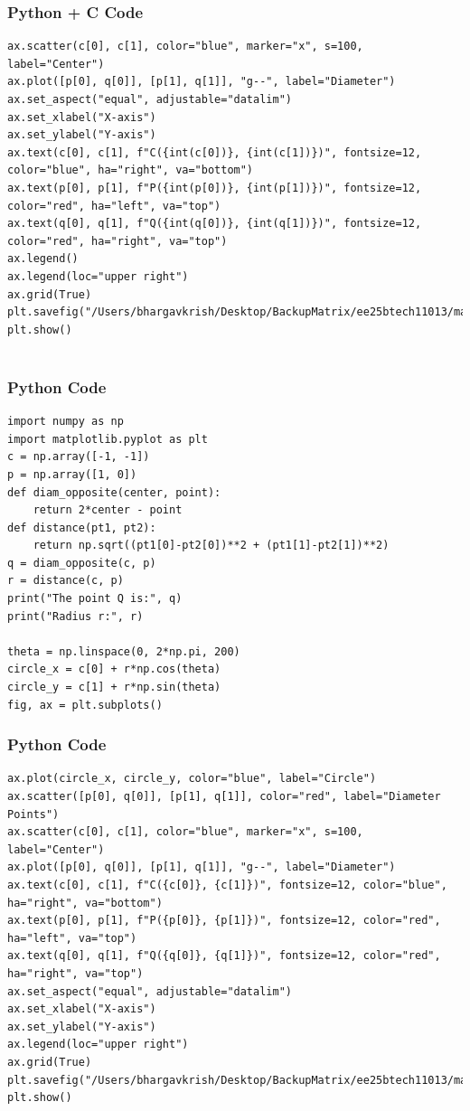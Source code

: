 \documentclass{beamer}
\begin{document}
\begin{frame}[fragile]
    \frametitle{Python + C Code}
    \begin{lstlisting}
ax.scatter(c[0], c[1], color="blue", marker="x", s=100, label="Center")
ax.plot([p[0], q[0]], [p[1], q[1]], "g--", label="Diameter")
ax.set_aspect("equal", adjustable="datalim")
ax.set_xlabel("X-axis")
ax.set_ylabel("Y-axis")
ax.text(c[0], c[1], f"C({int(c[0])}, {int(c[1])})", fontsize=12, color="blue", ha="right", va="bottom")
ax.text(p[0], p[1], f"P({int(p[0])}, {int(p[1])})", fontsize=12, color="red", ha="left", va="top")
ax.text(q[0], q[1], f"Q({int(q[0])}, {int(q[1])})", fontsize=12, color="red", ha="right", va="top")
ax.legend()
ax.legend(loc="upper right")
ax.grid(True)
plt.savefig("/Users/bhargavkrish/Desktop/BackupMatrix/ee25btech11013/matgeo/7.4.20/figs/Figure_1.png")
plt.show()


    \end{lstlisting}
\end{frame}

\begin{frame}[fragile]
    \frametitle{Python Code}
    \begin{lstlisting}
import numpy as np
import matplotlib.pyplot as plt
c = np.array([-1, -1])
p = np.array([1, 0])
def diam_opposite(center, point):
    return 2*center - point
def distance(pt1, pt2):
    return np.sqrt((pt1[0]-pt2[0])**2 + (pt1[1]-pt2[1])**2)
q = diam_opposite(c, p)
r = distance(c, p)
print("The point Q is:", q)
print("Radius r:", r)

theta = np.linspace(0, 2*np.pi, 200)
circle_x = c[0] + r*np.cos(theta)
circle_y = c[1] + r*np.sin(theta)
fig, ax = plt.subplots()
    \end{lstlisting}
\end{frame}
\begin{frame}[fragile]
    \frametitle{Python Code}
    \begin{lstlisting}
ax.plot(circle_x, circle_y, color="blue", label="Circle")
ax.scatter([p[0], q[0]], [p[1], q[1]], color="red", label="Diameter Points")
ax.scatter(c[0], c[1], color="blue", marker="x", s=100, label="Center")
ax.plot([p[0], q[0]], [p[1], q[1]], "g--", label="Diameter")
ax.text(c[0], c[1], f"C({c[0]}, {c[1]})", fontsize=12, color="blue", ha="right", va="bottom")
ax.text(p[0], p[1], f"P({p[0]}, {p[1]})", fontsize=12, color="red", ha="left", va="top")
ax.text(q[0], q[1], f"Q({q[0]}, {q[1]})", fontsize=12, color="red", ha="right", va="top")
ax.set_aspect("equal", adjustable="datalim")
ax.set_xlabel("X-axis")
ax.set_ylabel("Y-axis")
ax.legend(loc="upper right")
ax.grid(True)
plt.savefig("/Users/bhargavkrish/Desktop/BackupMatrix/ee25btech11013/matgeo/7.4.20/figs/Figure_1.png")  
plt.show()

    \end{lstlisting}
\end{frame}
\end{document}
